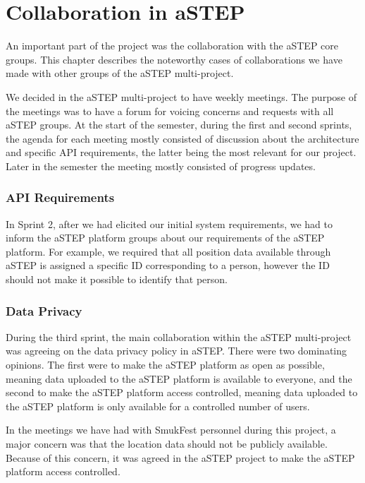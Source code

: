 \chapter{Collaboration in aSTEP}\label{ch:collab}

An important part of the project was the collaboration with the aSTEP core groups. This chapter describes the noteworthy cases of collaborations we have made with other groups of the aSTEP multi-project.

We decided in the aSTEP multi-project to have weekly meetings. The purpose of the meetings was to have a forum for voicing concerns and requests with all aSTEP groups. At the start of the semester, during the first and second sprints, the agenda for each meeting mostly consisted of discussion about the architecture and specific API requirements, the latter being the most relevant for our project. Later in the semester the meeting mostly consisted of progress updates.

\subsection{API Requirements}
In Sprint 2, after we had elicited our initial system requirements, we had to inform the aSTEP platform groups about our requirements of the aSTEP platform. For example, we required that all position data available through aSTEP is assigned a specific ID corresponding to a person, however the ID should not make it possible to identify that person.

\subsection{Data Privacy}

During the third sprint, the main collaboration within the aSTEP multi-project was agreeing on the data privacy policy in aSTEP. There were two dominating opinions. The first were to make the aSTEP platform as open as possible, meaning data uploaded to the aSTEP platform is available to everyone, and the second to make the aSTEP platform access controlled, meaning data uploaded to the aSTEP platform is only available for a controlled number of users.

In the meetings we have had with SmukFest personnel during this project, a major concern was that the location data should not be publicly available. Because of this concern, it was agreed in the aSTEP project to make the aSTEP platform access controlled.

